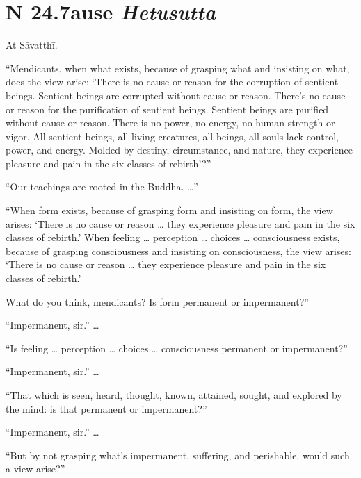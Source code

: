 \documentclass[12pt,openany]{book}%
\newcommand*{\suttatitleacronym}[1]{\smaller[2]{#1}\vspace*{.3em}}
\newcommand*{\suttatitletranslation}[1]{\linebreak{#1}}
\newcommand*{\suttatitleroot}[1]{\linebreak\smaller[2]\itshape{#1}}
\newcommand*{\tocacronym}[1]{\hspace*{-3.3em}{#1}\quad}
\newcommand*{\toctranslation}[1]{#1}
\newcommand*{\tocroot}[1]{(\textit{#1})}
\begin{document}
%
\section*{{\suttatitleacronym SN 24.7}{\suttatitletranslation Cause }{\suttatitleroot Hetusutta}}
\addcontentsline{toc}{section}{\tocacronym{SN 24.7} \toctranslation{Cause } \tocroot{Hetusutta}}

At \textsanskrit{Sāvatthī}. 

“Mendicants, when what exists, because of grasping what and insisting on what, does the view arise: ‘There is no cause or reason for the corruption of sentient beings. Sentient beings are corrupted without cause or reason. There’s no cause or reason for the purification of sentient beings. Sentient beings are purified without cause or reason. There is no power, no energy, no human strength or vigor. All sentient beings, all living creatures, all beings, all souls lack control, power, and energy. Molded by destiny, circumstance, and nature, they experience pleasure and pain in the six classes of rebirth’?” 

“Our teachings are rooted in the Buddha. …” 

“When form exists, because of grasping form and insisting on form, the view arises: ‘There is no cause or reason … they experience pleasure and pain in the six classes of rebirth.’ When feeling … perception … choices … consciousness exists, because of grasping consciousness and insisting on consciousness, the view arises: ‘There is no cause or reason … they experience pleasure and pain in the six classes of rebirth.’ 

What do you think, mendicants? Is form permanent or impermanent?” 

“Impermanent, sir.” … 

“Is feeling … perception … choices … consciousness permanent or impermanent?” 

“Impermanent, sir.” … 

“That which is seen, heard, thought, known, attained, sought, and explored by the mind: is that permanent or impermanent?” 

“Impermanent, sir.” … 

“But by not grasping what’s impermanent, suffering, and perishable, would such a view arise?” 
\end{document}
